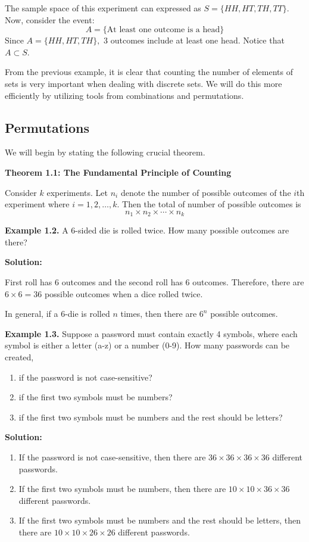 \documentclass[
  12pt,
]{krantzNoCorner}
\providecommand{\tightlist}{%
  \setlength{\itemsep}{0pt}\setlength{\parskip}{0pt}}
\begin{document}
The sample space of this experiment can expressed as
\(S=\{HH,HT,TH,TT\}\). Now, consider the event:
\[A=\{\text{At least one outcome is a head}\}\]
Since \(A=\{HH,HT,TH\},\) 3 outcomes include at least one head. Notice that \(A\subset S\).

From the previous example, it is clear that counting the number of
elements of sets is very important when dealing with discrete sets. We
will do this more efficiently by utilizing tools from combinations and
permutations.

\hypertarget{permutations}{%
\subsection{Permutations}\label{permutations}}

We will begin by stating the following crucial theorem.

\textbf{Theorem 1.1: The Fundamental Principle of Counting}

Consider \(k\) experiments. Let \(n_i\) denote the number of possible
outcomes of the \(i\)th experiment where \(i=1,2,\dots,k.\) Then the total
of number of possible outcomes is
\[n_1\times n_2\times\cdots\times n_k\]

\textbf{Example 1.2.} A 6-sided die is rolled twice. How many possible
outcomes are there?

\textbf{Solution:}

First roll has 6 outcomes and the second roll has 6 outcomes. Therefore,
there are \(6\times 6 = 36\) possible outcomes when a dice rolled twice.

In general, if a 6-die is rolled \(n\) times, then there are \(6^n\)
possible outcomes.

\textbf{Example 1.3.} Suppose a password must contain exactly 4 symbols,
where each symbol is either a letter (a-z) or a number (0-9). How many
passwords can be created,

\begin{enumerate}
\def\labelenumi{\arabic{enumi}.}
\tightlist
\item
  if the password is not case-sensitive?
\item
  if the first two symbols must be numbers?
\item
  if the first two symbols must be numbers and the rest should be
  letters?
\end{enumerate}

\textbf{Solution:}

\begin{enumerate}
\def\labelenumi{\arabic{enumi}.}
\tightlist
\item
  If the password is not case-sensitive, then there are
  \(36\times36\times36\times36\) different passwords.
\item
  If the first two symbols must be numbers, then there are
  \(10\times10\times36\times36\) different passwords.
\item
  If the first two symbols must be numbers and the rest should be
  letters, then there are \(10\times10\times26\times26\) different
  passwords.
\end{enumerate}
\end{document}
